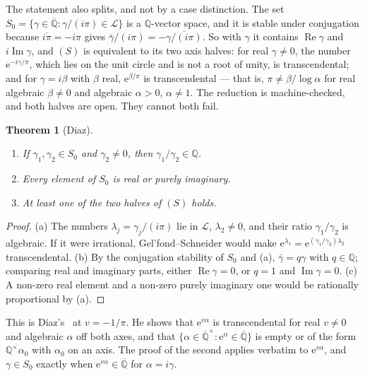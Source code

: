 \documentclass[11pt,a4paper]{article}
\theoremstyle{plain}
\newtheorem{theorem}{Theorem}[section]
\theoremstyle{definition}
\newcommand{\e}{\mathrm{e}}
\newcommand{\Q}{\mathbb{Q}}
\newcommand{\Alg}{\overline{\mathbb{Q}}}
\newcommand{\Logs}{\mathcal{L}}
\begin{document}
The statement also splits, and not by a case distinction. The set
$S_{0}=\{\gamma\in\Alg:\gamma/(i\pi)\in\Logs\}$ is a $\Q$-vector space, and it is stable under
conjugation because $\overline{i\pi}=-i\pi$ gives $\bar\gamma/(i\pi)=-\overline{\gamma/(i\pi)}$. So
with $\gamma$ it contains $\operatorname{Re}\gamma$ and $i\operatorname{Im}\gamma$, and $(S)$ is
equivalent to its two axis halves: for real $\gamma\neq0$, the number $\e^{-i\gamma/\pi}$, which
lies on the unit circle and is not a root of unity, is transcendental; and for $\gamma=i\beta$ with
$\beta$ real, $\e^{\beta/\pi}$ is transcendental --- that is, $\pi\neq\beta/\log\alpha$ for real
algebraic $\beta\neq0$ and algebraic $\alpha>0$, $\alpha\neq1$. The reduction is machine-checked,
and both halves are open. They cannot both fail.

\begin{theorem}[Diaz]\label{thm:S0}
\begin{enumerate}[label=\textup{(\alph*)}]
  \item If $\gamma_{1},\gamma_{2}\in S_{0}$ and $\gamma_{2}\neq0$, then $\gamma_{1}/\gamma_{2}\in\Q$.
  \item Every element of $S_{0}$ is real or purely imaginary.
  \item At least one of the two halves of $(S)$ holds.
\end{enumerate}
\end{theorem}

\begin{proof}
(a) The numbers $\lambda_{j}=\gamma_{j}/(i\pi)$ lie in $\Logs$, $\lambda_{2}\neq0$, and their ratio
$\gamma_{1}/\gamma_{2}$ is algebraic. If it were irrational, Gel'fond--Schneider would make
$\e^{\lambda_{1}}=\e^{(\gamma_{1}/\gamma_{2})\lambda_{2}}$ transcendental. (b) By the conjugation
stability of $S_{0}$ and (a), $\bar\gamma=q\gamma$ with $q\in\Q$; comparing real and imaginary
parts, either $\operatorname{Re}\gamma=0$, or $q=1$ and $\operatorname{Im}\gamma=0$. (c) A non-zero
real element and a non-zero purely imaginary one would be rationally proportional by (a).
\end{proof}

This is Diaz's~\cite[Th\'eor\`emes~4 and~5]{diaz-2004} at $v=-1/\pi$. He shows that $\e^{v\alpha}$
is transcendental for real $v\neq0$ and algebraic $\alpha$ off both axes, and that
$\{\alpha\in\Alg^{\times}:\e^{\alpha}\in\Alg\}$ is empty or of the form $\Q^{\times}\alpha_{0}$ with
$\alpha_{0}$ on an axis. The proof of the second applies verbatim to $\e^{v\alpha}$, and
$\gamma\in S_{0}$ exactly when $\e^{v\alpha}\in\Alg$ for $\alpha=i\gamma$.
\end{document}
